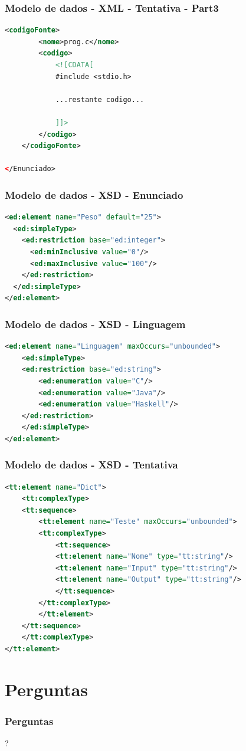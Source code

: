 \documentclass{beamer}
\begin{document}
\begin{frame}[fragile] \frametitle{Modelo de dados - XML - Tentativa - Part3}
\begin{lstlisting}[language=XML,basicstyle=\tiny,breaklines=true]
    <codigoFonte>
        <nome>prog.c</nome>
        <codigo>
            <![CDATA[
            #include <stdio.h>
            
            ...restante codigo...
            
            ]]>
        </codigo>
    </codigoFonte>
        
</Enunciado>
\end{lstlisting}
\end{frame}

\begin{frame}[fragile] \frametitle{Modelo de dados - XSD - Enunciado}
\begin{lstlisting}[language=XML,basicstyle=\tiny,breaklines=true]
<ed:element name="Peso" default="25">
  <ed:simpleType>
    <ed:restriction base="ed:integer">
      <ed:minInclusive value="0"/>
      <ed:maxInclusive value="100"/>
    </ed:restriction>
  </ed:simpleType>
</ed:element>
\end{lstlisting}
\end{frame}

\begin{frame}[fragile] \frametitle{Modelo de dados - XSD - Linguagem}
\begin{lstlisting}[language=XML,basicstyle=\tiny,breaklines=true]
<ed:element name="Linguagem" maxOccurs="unbounded">
    <ed:simpleType>
    <ed:restriction base="ed:string">
        <ed:enumeration value="C"/>
        <ed:enumeration value="Java"/>
        <ed:enumeration value="Haskell"/>
    </ed:restriction>
    </ed:simpleType>
</ed:element>
\end{lstlisting}
\end{frame}

\begin{frame}[fragile] \frametitle{Modelo de dados - XSD - Tentativa}
\begin{lstlisting}[language=XML,basicstyle=\tiny,breaklines=true]
<tt:element name="Dict">
    <tt:complexType>
    <tt:sequence>
        <tt:element name="Teste" maxOccurs="unbounded">
        <tt:complexType>
            <tt:sequence>
            <tt:element name="Nome" type="tt:string"/>
            <tt:element name="Input" type="tt:string"/>
            <tt:element name="Output" type="tt:string"/>
            </tt:sequence>
        </tt:complexType>
        </tt:element>
    </tt:sequence>
    </tt:complexType>
</tt:element>
\end{lstlisting}
\end{frame}

\section*{Perguntas}
\begin{frame} \frametitle{Perguntas}
\begin{center}\huge{?}\end{center}
\end{frame}
\end{document}
